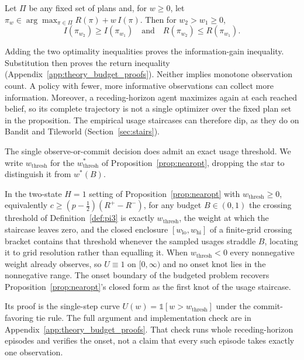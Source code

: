 \begin{proposition}
\label{prop:pi2}
Let $\Pi$ be any fixed set of plans and, for $w \ge 0$, let $\pi_w \in \arg\max_{\pi \in \Pi} R(\pi) + w\, I(\pi)$. Then for $w_2 > w_1 \ge 0$,
\begin{equation}
I(\pi_{w_2}) \ge I(\pi_{w_1}) \quad \text{and} \quad R(\pi_{w_2}) \le R(\pi_{w_1}).
\end{equation}
\end{proposition}

Adding the two optimality inequalities proves the information-gain inequality. Substitution then proves the return inequality (Appendix~\ref{app:theory_budget_proofs}). Neither implies monotone observation count. A policy with fewer, more informative observations can collect more information. Moreover, a receding-horizon agent maximizes again at each reached belief, so its complete trajectory is not a single optimizer over the fixed plan set in the proposition. The empirical usage staircases can therefore dip, as they do on Bandit and Tileworld (Section~\ref{sec:stairs}).

The single observe-or-commit decision does admit an exact usage threshold. We write $w_{\mathrm{thresh}}$ for the $w^*_{\mathrm{thresh}}$ of Proposition~\ref{prop:nearopt}, dropping the star to distinguish it from $w^*(B)$.

\begin{corollary}
\label{cor:pi4}
In the two-state $H{=}1$ setting of Proposition~\ref{prop:nearopt} with $w_{\mathrm{thresh}} \geq 0$, equivalently $c \geq (p - \tfrac{1}{2})(R^+ - R^-)$, for any budget $B \in (0,1)$ the crossing threshold of Definition~\ref{def:pi3} is exactly $w_{\mathrm{thresh}}$, the weight at which the staircase leaves zero, and the closed enclosure $[w_{\mathrm{lo}}, w_{\mathrm{hi}}]$ of a finite-grid crossing bracket contains that threshold whenever the sampled usages straddle $B$, locating it to grid resolution rather than equalling it. When $w_{\mathrm{thresh}} < 0$ every nonnegative weight already observes, so $U \equiv 1$ on $[0,\infty)$ and no onset knot lies in the nonnegative range. The onset boundary of the budgeted problem recovers Proposition~\ref{prop:nearopt}'s closed form as the first knot of the usage staircase.
\end{corollary}

Its proof is the single-step curve $U(w)=\mathbb 1[w>w_{\mathrm{thresh}}]$ under the commit-favoring tie rule. The full argument and implementation check are in Appendix~\ref{app:theory_budget_proofs}. That check runs whole receding-horizon episodes and verifies the onset, not a claim that every such episode takes exactly one observation.


